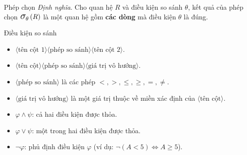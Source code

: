\documentclass[11pt]{beamer}
\newcommand{\mmm}[1]{\mathlarger{\mathlarger{\mathlarger#1}}}%
\newcommand{\psig}[2]{\mmm{\sigma}_{#1}\left(#2\right)}%
\begin{document}
  \begin{frame}{Phép chọn}
  \textit{Định nghĩa}. Cho quan hệ $R$ và điều kiện so sánh $\theta$, kết quả của 
  phép chọn $\psig{\theta}{R}$ là một quan hệ gồm \textbf{các dòng} mà điều kiện $\theta$ là đúng.
  \end{frame}
  \begin{frame}{Điều kiện so sánh}
    \begin{itemize}
      \item<2-> $\langle\text{tên cột 1}\rangle\langle\text{phép so sánh}\rangle\langle\text{tên cột 2}\rangle$.
      \item<3-> $\langle\text{tên cột}\rangle\langle\text{phép so sánh}\rangle\langle\text{giá trị vô hướng}\rangle$.
    \end{itemize}
  \end{frame}
  \begin{frame}
    \begin{itemize}
      \item<2-> $\langle\text{phép so sánh}\rangle$ là các phép $<, >, \leq, \geq, =, \neq$.
      \item<3-> $\langle\text{giá trị vô hướng}\rangle$ là một giá trị thuộc về miền xác định của $\langle\text{tên cột}\rangle$.
    \end{itemize}
  \end{frame}
  \begin{frame}
    \begin{itemize}
      \item<2-> $\varphi \wedge \psi$: cả hai điều kiện được thỏa.
      \item<3-> $\varphi \vee \psi$: một trong hai điều kiện được thỏa.
      \item<4-> $\neg \varphi$: phủ định điều kiện $\varphi$ (ví dụ: $\neg (A < 5) \Leftrightarrow A \geq 5$).
    \end{itemize}
  \end{frame}
\end{document}
